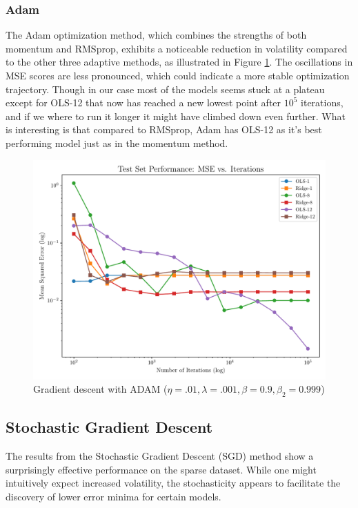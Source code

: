 \documentclass[twocolumn,aps]{revtex4}
\begin{document}
\subsubsection{Adam}

The Adam optimization method, which combines the strengths of both momentum and RMSprop, exhibits a noticeable reduction in volatility compared to the other three adaptive methods, as illustrated in Figure \ref{fig:GradADAM}. 
The oscillations in MSE scores are less pronounced, which could indicate a more stable optimization trajectory.
Though in our case most of the models seems stuck at a plateau except for OLS-12 that now has reached a new lowest point after $10^5$ iterations, and if we where to run it longer it might have climbed down even further.
What is interesting is that compared to RMSprop, Adam has OLS-12 as it's best performing model just as in the momentum method.
\\

\begin{figure}[h]
    \centering
    \includegraphics[width=.95 \linewidth]{Figures/OLS_Ridge_ADAM.pdf}
    \caption{Gradient descent with ADAM ($\eta=.01, \lambda=.001, \beta=0.9,\beta_2=0.999$)}
    \label{fig:GradADAM}
\end{figure}


\subsection{Stochastic Gradient Descent}

The results from the Stochastic Gradient Descent (SGD) method show a surprisingly effective performance on the sparse dataset. While one might intuitively expect increased volatility, the stochasticity appears to facilitate the discovery of lower error minima for certain models.
\end{document}
